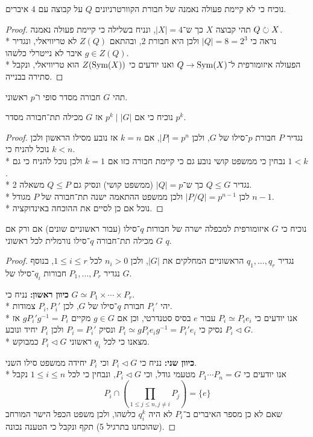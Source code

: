 \Subquestion{}
נוכיח כי לא קיימת פעולה נאמנה של חבורת הקוורטרניונים $Q$ על קבוצה עם $4$ איברים.
\begin{proof}
	תהי קבוצה $X$ כך ש־$|X| = 4$, ונניח בשלילה כי קיימת פעולה נאמנה $Q \circlearrowright X$. \\*
	נראה כי $|Q| = 8 = 2^3$ ולכן היא חבורת $2$, ובהתאם $Z(Q)$ לא טריוויאלי, ונגדיר $g \in Z(Q)$ איבר לא נייטרלי כלשהו. \\*
	הפעולה איזומורפית ל־$Q \to \operatorname{Sym}(X)$ ואנו יודעים כי $Z(\operatorname{Sym}(X))$ הוא טריוויאלי, ונקבל סתירה בבנייה.
\end{proof}

\Question{}
תהי $G$ חבורה מסדר סופי ו־$p$ ראשוני.

\Subquestion{}
נוכיח כי אם $p^k \mid |G|$ אז $G$ מכילה תת־חבורה מסדר $p^k$.
\begin{proof}
	נגדיר $P$ חבורת $p$־סילו של $G$, ולכן $|P| = p^n$, אם $k = n$ אז נובע מסילו הראשון ולכן נוכל להניח כי $k < n$. \\*
	נבחין כי ממשפט קושי נובע גם כי קיימת חבורה כזו אם $k = 1$ ולכן נוכל להניח כי גם $1 < k$. \\*
	נגדיר $Q \le G$ כך ש־$|Q| = p$ (ממשפט קושי) ונסיק גם $Q \le P$ משאלה 2. \\*
	לכן $|P/Q| = p^{n - 1}$ ולכן ממשפט ההתאמה ישנה תת־חבורה של $P$ מגודל $n - 1$. \\*
	נוכל אם כן לסיים את ההוכחה באינדוקציה.
\end{proof}

\Subquestion{}
נוכיח כי $G$ איזומורפית למכפלה ישרה של חבורות $q$־סילו (עבור ראשוניים שונים) אם ורק אם $G$ מכילה תת־חבורה $q$־סילו נורמלית לכל ראשוני $q$.
\begin{proof}
	נגדיר $q_1, \dots, q_r$ הראשוניים המחלקים את $|G|$, ולכן $n_i > 0$ לכל $1 \le i \le r$, בנוסף נגדיר $P_1, \dots, P_r$ חבורות $q_i$־סילו של $G$.

	\textbf{כיוון ראשון:}
	נניח כי $G \simeq P_1 \times \cdots \times P_r$. \\*
	יהי $P_i'$ חבורת $q$־סילו של $G$, לכן $P_i, P_i'$ צמודות. \\*
	אנו יודעים כי $P_i \simeq P_i e_i$ עבור $e$ בסיס סטנדרטי, וכן אם $g \in G$ מקיים $g P_i' g^{-1} = P_i$ אז נסיק כי $P_i \simeq g P_i e_i g^{-1} = P_i' e_i$ ונסיק $P_i = P_i'$ ולכן $P_i$ יחיד ונובע $P_i \triangleleft G$. \\*
	מצאנו כי לכל $q_i$ ראשוני $P_i \triangleleft G$ כמבוקש.

	\textbf{כיוון שני:}
	נניח כי $P_i \triangleleft G$ וכי $P_i$ יחידה ממשפט סילו השני. \\*
	אנו יודעים כי $P_1 \cdots P_n = G$ מטעמי גודל, וכי $P_i \triangleleft G$, ונבחין כי לכל $1 \le i \le n$ נקבל
	\[
		P_i \cap ( \prod_{1 \le j \le n, j \ne i} P_j ) = \{ e \}
	\]
	שאם לא כן מספר האיברים ב־$P_i$ לא היה $q_i^k$ כלשהו, ולכן משפט הכפל הישר המורחב (שהוכחנו בתרגיל 5) תקף ונקבל כי הטענה נכונה.
\end{proof}

